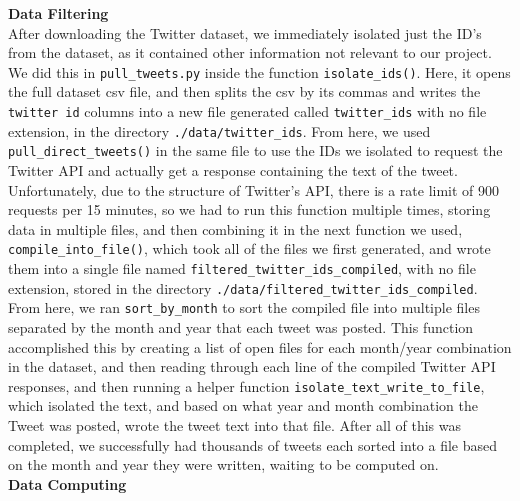 \documentclass[fontsize=11pt]{article}
\begin{document}
    \textbf{Data Filtering}\\
    After downloading the Twitter dataset, we immediately isolated just the ID's from the dataset, as it contained other information not relevant to our project. We did this in \texttt{pull\_tweets.py} inside the function \texttt{isolate\_ids()}. Here, it opens the full dataset csv file, and then splits the csv by its commas and writes the \texttt{twitter id} columns into a new file generated called \texttt{twitter\_ids} with no file extension, in the directory \texttt{./data/twitter\_ids}. From here, we used \texttt{pull\_direct\_tweets()} in the same file to use the IDs we isolated to request the Twitter API and actually get a response containing the text of the tweet. Unfortunately, due to the structure of Twitter's API, there is a rate limit of 900 requests per 15 minutes, so we had to run this function multiple times, storing data in multiple files, and then combining it in the next function we used, \texttt{compile\_into\_file()}, which took all of the files we first generated, and wrote them into a single file named \texttt{filtered\_twitter\_ids\_compiled}, with no file extension, stored in the directory \texttt{./data/filtered\_twitter\_ids\_compiled}. From here, we ran \texttt{sort\_by\_month} to sort the compiled file into multiple files separated by the month and year that each tweet was posted. This function accomplished this by creating a list of open files for each month/year combination in the dataset, and then reading through each line of the compiled Twitter API responses, and then running a helper function \texttt{isolate\_text\_write\_to\_file}, which isolated the text, and based on what year and month combination the Tweet was posted, wrote the tweet text into that file. After all of this was completed, we successfully had thousands of tweets each sorted into a file based on the month and year they were written, waiting to be computed on. \\
    \hfill\break
    \textbf{Data Computing} \\
\end{document}
